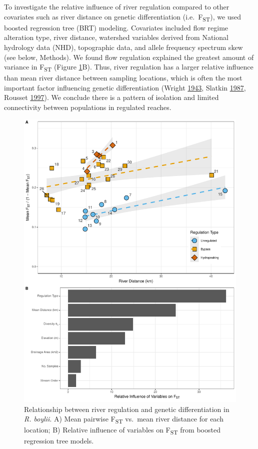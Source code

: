 \documentclass[proquest,12pt,final]{ucthesis-CA2012} %
\begin{document}
\begin{ucmainmatter}
To investigate the relative influence of river regulation compared to
other covariates such as river distance on genetic differentiation
(i.e.~F\textsubscript{ST}), we used boosted regression tree (BRT)
modeling. Covariates included flow regime alteration type, river
distance, watershed variables derived from National hydrology data
(NHD), topographic data, and allele frequency spectrum skew (see below,
Methods). We found flow regulation explained the greatest amount of
variance in F\textsubscript{ST} (Figure \ref{fig:CH1F3fst}B). Thus,
river regulation has a larger relative influence than mean river
distance between sampling locations, which is often the most important
factor influencing genetic differentiation (Wright
\protect\hyperlink{ref-wright_isolation_1943}{1943}, Slatkin
\protect\hyperlink{ref-slatkin_gene_1987}{1987}, Rousset
\protect\hyperlink{ref-rousset_genetic_1997}{1997}). We conclude there
is a pattern of isolation and limited connectivity between populations
in regulated reaches.






\begin{figure}
\includegraphics[width=0.9\linewidth]{figure/ch1/fig_03ab_fst_brt_cowplot_for_phd} \caption{Relationship between river regulation and genetic
differentiation in \emph{R. boylii}. A) Mean pairwise
F\textsubscript{ST} vs.~mean river distance for each location; B)
Relative influence of variables on F\textsubscript{ST} from boosted
regression tree models.}\label{fig:CH1F3fst}
\end{figure}
\clearpage


\end{ucmainmatter}
\end{document}
